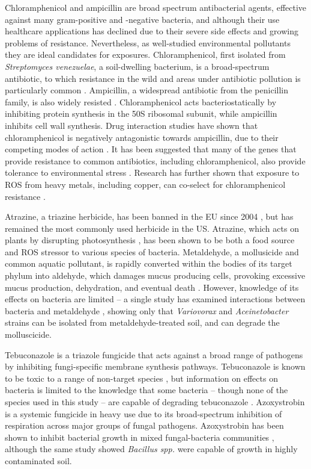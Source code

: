 \documentclass[10pt]{article}
\begin{document}
Chloramphenicol and ampicillin are broad spectrum antibacterial agents, effective against many gram-positive and -negative bacteria, and although their use healthcare applications has declined due to their severe side effects and growing problems of resistance. Nevertheless, as well-studied environmental pollutants they are ideal candidates for exposures. Chloramphenicol, first isolated from \textit{Streptomyces venezuelae}, a soil-dwelling bacterium, is a broad-spectrum antibiotic, to which resistance in the wild and areas under antibiotic pollution is particularly common \cite{Allen2010}. Ampicillin, a widespread antibiotic from the penicillin family, is also widely resisted \cite{Ruiz1999MechanismsFish}. Chloramphenicol acts bacteriostatically by inhibiting protein synthesis in the 50S ribosomal subunit, while ampicillin inhibits cell wall synthesis. Drug interaction studies have shown that chloramphenicol is negatively antagonistic towards ampicillin, due to their competing modes of action \cite{vanBambeke2017}. It has been suggested that many of the genes that provide resistance to common antibiotics, including chloramphenicol, also provide tolerance to environmental stress \cite{Groh2007}. Research has further shown that exposure to ROS from heavy metals, including copper, can co-select for chloramphenicol resistance \cite{Harrison2009}.

Atrazine, a triazine herbicide, has been banned in the EU since 2004 \cite{EU2004}, but has remained the most commonly used herbicide in the US. Atrazine, which acts on plants by disrupting photosynthesis \cite{Shimabukuro1969}, has been shown to be both a food source \cite{Wackett2002} and ROS stressor \cite{Zhang2012} to various species of bacteria. Metaldehyde, a mollusicide and common aquatic pollutant, is rapidly converted within the bodies of its target phylum into aldehyde, which damages mucus producing cells, provoking excessive mucus production, dehydration, and eventual death \cite{Triebskorn1998}. However, knowledge of its effects on bacteria are limited -- a single study has examined interactions between bacteria and metaldehyde \cite{Thomas2017}, showing only that \textit{Variovorax} and \textit{Aceinetobacter} strains can be isolated from metaldehyde-treated soil, and can degrade the molluscicide.

Tebuconazole is a triazole fungicide that acts against a broad range of pathogens by inhibiting fungi-specific membrane synthesis pathways. Tebuconazole is known to be toxic to a range of non-target species \cite{Sehnem2010}, but information on effects on bacteria is limited to the knowledge that some bacteria -- though none of the species used in this study -- are capable of degrading tebuconazole \cite{Sehnem2010}. Azoxystrobin is a systemic fungicide in heavy use due to its broad-spectrum inhibition of respiration across major groups of fungal pathogens. Azoxystrobin has been shown to inhibit bacterial growth in mixed fungal-bacteria communities \cite{Bacmaga2015MicrobialAzoxystrobin}, although the same study showed \textit{Bacillus spp.} were capable of growth in highly contaminated soil.
\end{document}
